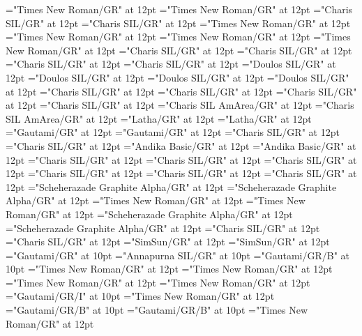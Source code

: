 \documentclass[a4paper]{article}
\begin{document}
\font\divmy="Times New Roman/GR" at 12pt
\font\spanmy="Times New Roman/GR" at 12pt
\font\divne="Charis SIL/GR" at 12pt
\font\spanne="Charis SIL/GR" at 12pt
\font\divpt="Times New Roman/GR" at 12pt
\font\spanpt="Times New Roman/GR" at 12pt
\font\divqaaxlel="Times New Roman/GR" at 12pt
\font\spanqaaxlel="Times New Roman/GR" at 12pt
\font\divro="Charis SIL/GR" at 12pt
\font\spanro="Charis SIL/GR" at 12pt
\font\divru="Charis SIL/GR" at 12pt
\font\spanru="Charis SIL/GR" at 12pt
\font\divsehfonipaxetic="Doulos SIL/GR" at 12pt
\font\spansehfonipaxetic="Doulos SIL/GR" at 12pt
\font\divsehfonipa="Doulos SIL/GR" at 12pt
\font\spansehfonipa="Doulos SIL/GR" at 12pt
\font\divsehZxxxxaudio="Charis SIL/GR" at 12pt
\font\spansehZxxxxaudio="Charis SIL/GR" at 12pt
\font\divseh="Charis SIL/GR" at 12pt
\font\spanseh="Charis SIL/GR" at 12pt
\font\divstp="Charis SIL AmArea/GR" at 12pt
\font\spanstp="Charis SIL AmArea/GR" at 12pt
\font\divta="Latha/GR" at 12pt
\font\spanta="Latha/GR" at 12pt
\font\divte="Gautami/GR" at 12pt
\font\spante="Gautami/GR" at 12pt
\font\divth="Charis SIL/GR" at 12pt
\font\spanth="Charis SIL/GR" at 12pt
\font\divtpi="Andika Basic/GR" at 12pt
\font\spantpi="Andika Basic/GR" at 12pt
\font\divtrfonipaxemic="Charis SIL/GR" at 12pt
\font\spantrfonipaxemic="Charis SIL/GR" at 12pt
\font\divtrfonipa="Charis SIL/GR" at 12pt
\font\spantrfonipa="Charis SIL/GR" at 12pt
\font\divtr="Charis SIL/GR" at 12pt
\font\spantr="Charis SIL/GR" at 12pt
\font\divurArab="Scheherazade Graphite Alpha/GR" at 12pt
\font\spanurArab="Scheherazade Graphite Alpha/GR" at 12pt
\font\divurxind="Times New Roman/GR" at 12pt
\font\spanurxind="Times New Roman/GR" at 12pt
\font\divur="Scheherazade Graphite Alpha/GR" at 12pt
\font\spanur="Scheherazade Graphite Alpha/GR" at 12pt
\font\divvi="Charis SIL/GR" at 12pt
\font\spanvi="Charis SIL/GR" at 12pt
\font\divzhCN="SimSun/GR" at 12pt
\font\spanzhCN="SimSun/GR" at 12pt
\font\xitemte="Gautami/GR" at 10pt
\font\xitemhi="Annapurna SIL/GR" at 10pt
\font\xitemxitemcomplexformformbefore="Gautami/GR/B" at 10pt
\font\xitemxitemcomplexformrefsbefore="Times New Roman/GR" at 12pt
\font\xitemxitemdefinitionbefore="Times New Roman/GR" at 12pt
\font\xitemxitementryrefcomponentbefore="Times New Roman/GR" at 12pt
\font\xitemxitementryreftypebefore="Times New Roman/GR" at 12pt
\font\xitemxitemexamplebefore="Gautami/GR/I" at 10pt
\font\xitemxitemexamplesbefore="Times New Roman/GR" at 12pt
\font\xitemxitemheadwordbefore="Gautami/GR/B" at 10pt
\font\xitemxitemLexEntrypublishStemComponentTargetHeadWordRefbefore="Gautami/GR/B" at 10pt
\font\xitemxitemLexEntryTypepublishStemComplexFormTypeReverseAbbrPubbefore="Times New Roman/GR" at 12pt
\end{document}

